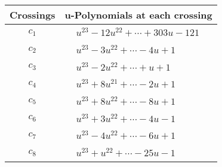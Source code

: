 \documentclass[1p]{elsarticle_modified}
\theoremstyle{definition}
\begin{document}
\begin{tabular}{m{50pt}|m{274pt}}
Crossings & \hspace{64pt}u-Polynomials at each crossing \\
\hline $$\begin{aligned}c_{1}\end{aligned}$$&$\begin{aligned}
&u^{23}-12 u^{22}+\cdots+303 u-121
\end{aligned}$\\
\hline $$\begin{aligned}c_{2}\end{aligned}$$&$\begin{aligned}
&u^{23}-3 u^{22}+\cdots-4 u+1
\end{aligned}$\\
\hline $$\begin{aligned}c_{3}\end{aligned}$$&$\begin{aligned}
&u^{23}-2 u^{22}+\cdots+u+1
\end{aligned}$\\
\hline $$\begin{aligned}c_{4}\end{aligned}$$&$\begin{aligned}
&u^{23}+8 u^{21}+\cdots-2 u+1
\end{aligned}$\\
\hline $$\begin{aligned}c_{5}\end{aligned}$$&$\begin{aligned}
&u^{23}+8 u^{22}+\cdots-8 u+1
\end{aligned}$\\
\hline $$\begin{aligned}c_{6}\end{aligned}$$&$\begin{aligned}
&u^{23}+3 u^{22}+\cdots-4 u-1
\end{aligned}$\\
\hline $$\begin{aligned}c_{7}\end{aligned}$$&$\begin{aligned}
&u^{23}-4 u^{22}+\cdots-6 u+1
\end{aligned}$\\
\hline $$\begin{aligned}c_{8}\end{aligned}$$&$\begin{aligned}
&u^{23}+u^{22}+\cdots-25 u-1
\end{aligned}$\\

\end{tabular}
\end{document}
